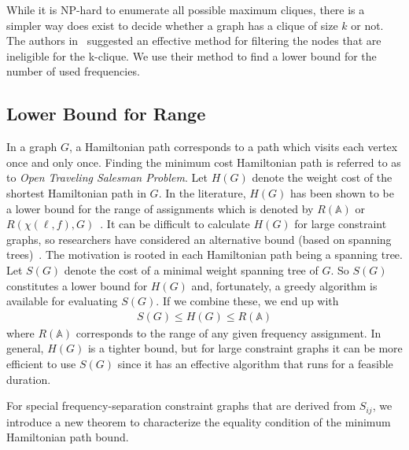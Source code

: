 \documentclass[10pt,twocolumn,twoside]{JCNtran}
\newcommand{\tbirkan}[1]{#1}
\newcommand{\linkl}{\ell}
\newcommand{\freqsepQuantized}[2]{S_{#1#2}}
\newcommand{\funcAssignment}[2]{\chi(#1, #2)}
\newcommand{\setUsedFreq}{\mbox{$\mathbb{A}$}}
\newcommand{\rangefa}{R}
\begin{document}
\tbirkan{While it is NP-hard to enumerate all possible maximum cliques, there is a simpler way does exist to decide whether a graph has a clique of size $k$ or not. The authors in~\cite{modani2008largeMC} suggested an effective method for filtering the nodes that are ineligible for the k-clique. We use their method to find a lower bound for the number of used frequencies.}

\subsection{Lower Bound for Range}
\label{subsec_bound_range}
\tbirkan{In a graph $G$, a Hamiltonian path corresponds to a path which visits each vertex once and only once. Finding the minimum cost Hamiltonian path is referred to as to \emph{Open Traveling Salesman Problem}. Let $H(G)$ denote the weight cost of the shortest Hamiltonian path in $G$. In the literature, $H(G)$ has been shown to be a lower bound for the range of assignments which is denoted by $\rangefa(\setUsedFreq)$ or $\rangefa(\funcAssignment{\linkl}{f}, G)$~\cite{allen1997frequencyAP,smith2000newLB,aardal2003modelsAS}. It can be difficult to calculate $H(G)$ for large constraint graphs, so researchers have considered an alternative bound (based on spanning trees)~\cite{allen1997frequencyAP,aardal2003modelsAS}. The motivation is rooted in each Hamiltonian path being a spanning tree. Let $S(G)$ denote the cost of a minimal weight spanning tree of $G$. So $S(G)$ constitutes a lower bound for $H(G)$ and, fortunately, a greedy algorithm is available for evaluating $S(G)$. If we combine these, we end up with
\begin{align}
 S(G) \leq H(G) \leq \rangefa(\setUsedFreq)
\end{align}
where $\rangefa(\setUsedFreq)$ corresponds to the range of any given frequency assignment. In general, $H(G)$ is a tighter bound, but for large constraint graphs it can be more efficient to use $S(G)$ since it has an effective algorithm that runs for a feasible duration. 
}

For special frequency-separation constraint graphs that are derived from $\freqsepQuantized{i}{j}$, we introduce a new theorem  \tbirkan{to characterize the equality condition of the minimum Hamiltonian path bound.} 
\end{document}
